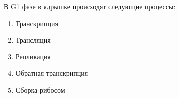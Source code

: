 
В G1 фазе в ядрышке происходят
следующие процессы:

\begin{enumerate}
    \item Транскрипция
    \item Трансляция
    \item Репликация
    \item Обратная транскрипция
    \item Сборка рибосом
\end{enumerate}



